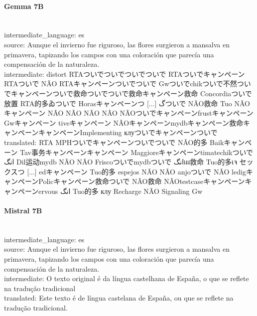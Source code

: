 \paragraph{Gemma 7B}~\\
{intermediate\_language:} es\\
{source:} Aunque el invierno fue riguroso, las flores surgieron a mansalva en primavera, tapizando los campos con una coloración que parecía una compensación de la naturaleza. \\
{intermediate:} distort RTAついでついでついでついで RTAついでキャンペーン RTAついで NÃO RTAキャンペーンついでついで Gwついでchikついで不然ついでキャンペーンついで救命ついでついで救命キャンペーン救命 Concordiaついで放置 RTA的多ゐついで Horasキャンペーンつ [...] گついで NÃO救命 Tuo NÃOキャンペーン NÃO NÃO NÃO NÃO NÃOついでキャンペーンfrustキャンペーン Gwキャンペーン tiveキャンペーン NÃOキャンペーンmydbキャンペーン救命キャンペーンキャンペーンImplementing клуついでキャンペーンついで\\
{translated:} RTA MPHついでキャンペーンついでついで NÃO的多 Baikキャンペーン Tav事务キャンペーンキャンペーン Maggioreキャンペーンtimatechikついで انگ Dil运动mydb NÃO NÃO Friscoついでmydbついで انگเผ救命 Tuo的多เจ セックスつ [...] edキャンペーン Tuo的多 espejos NÃO NÃO anjoついで NÃO ledigキャンペーンPolicキャンペーン救命ついで NÃO救命 NÃOtestcaseキャンペーンキャンペーンervous انگ Tuo的多 клу Recharge NÃO Signaling Gw\\

\paragraph{Mistral 7B}~\\
{intermediate\_language:} es\\
{source:} Aunque el invierno fue riguroso, las flores surgieron a mansalva en primavera, tapizando los campos con una coloración que parecía una compensación de la naturaleza. \\
{intermediate:} O texto original é da língua castelhana de España, o que se reflete na tradução tradicional\\
{translated:} Este texto é de língua castelana de España, ou que se reflete na tradução tradicional.\\

